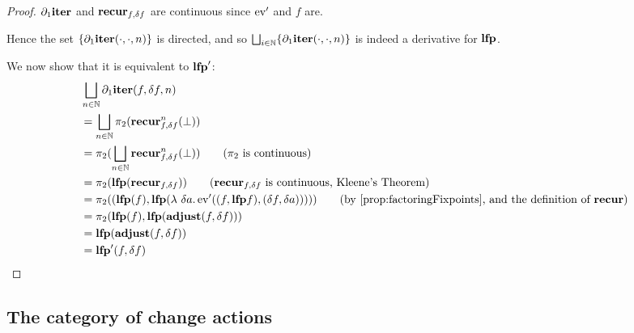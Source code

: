 \leastFixpointDerivatives*
\begin{proof}
  \label{prf:leastFixpointDerivatives}
  $\partial_1{\mathbf{iter}}$ and $\mathbf{recur}_{f, \delta f}$ are continuous since
  $\operatorname{ev}'$ and $f$ are.

  Hence the set $\{ \partial_1{\mathbf{iter}}(\cdot, \cdot, n) \}$ is directed, and so $\bigsqcup_{i \in \mathbb{N}}
  \{ \partial_1{\mathbf{iter}}(\cdot, \cdot, n) \}$ is indeed a derivative for $\mathbf{lfp}$.

  We now show that it is equivalent to $\mathbf{lfp}'$:
  \begin{align*}
    &\bigsqcup_{n \in \NN} \partial_1{\iter}(f, \change{f}, n)\\
    &=\bigsqcup_{n \in \NN} \pi_2(\nextiter_{f, \change{f}}^n(\bot))\\
    &=\pi_2(\bigsqcup_{n \in \NN} \nextiter_{f, \change{f}}^n(\bot)) \tag{$\pi_2$ is continuous}\\
    &= \pi_2 (\lfp(\nextiter_{f, \change{f}})) \tag{$\nextiter_{f, \change{f}}$ is continuous, Kleene's Theorem}\\
    &= \pi_2 ((\lfp(f), \lfp (\lambda\ \change{a}. \derive{\ev}((f, \lfp f), (\change{f}, \change{a})))))
    \tag{by \cref{prop:factoringFixpoints}, and the definition of $\nextiter$}\\
    &= \pi_2 (\lfp(f), \lfp(\adjust(f, \change{f})))\\
    &= \lfp(\adjust(f, \change{f}))\\
    &= \derive{\lfp}(f, \change{f})
  \end{align*}
\end{proof}

\subsection{The category of change actions}

